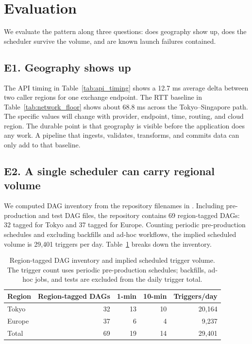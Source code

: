 \documentclass[11pt, reqno]{amsart}
\newcommand{\code}[1]{\texttt{\detokenize{#1}}}
\begin{document}
\section{Evaluation}
\label{sec:evaluation}

We evaluate the pattern along three questions: does geography show up, does the scheduler survive the volume, and are known launch failures contained.

\subsection{E1. Geography shows up}

The API timing in Table~\ref{tab:api_timing} shows a 12.7 ms average delta between two caller regions for one exchange endpoint. The RTT baseline in Table~\ref{tab:network_floor} shows about 68.8 ms across the Tokyo--Singapore path. The specific values will change with provider, endpoint, time, routing, and cloud region. The durable point is that geography is visible before the application does any work. A pipeline that ingests, validates, transforms, and commits data can only add to that baseline.

\subsection{E2. A single scheduler can carry regional volume}

We computed DAG inventory from the repository filenames in \code{datapull/airflow/dags/datapull}. Including pre-production and test DAG files, the repository contains 69 region-tagged DAGs: 32 tagged for Tokyo and 37 tagged for Europe. Counting periodic pre-production schedules and excluding backfills and ad-hoc workflows, the implied scheduled volume is 29,401 triggers per day. Table~\ref{tab:dag_volume} breaks down the inventory.

\begin{table}[H]
\centering
\begin{tabular}{lrrrr}
\toprule
\textbf{Region} & \textbf{Region-tagged DAGs} & \textbf{1-min} & \textbf{10-min} & \textbf{Triggers/day} \\
\midrule
Tokyo & 32 & 13 & 10 & 20,164 \\
Europe & 37 & 6 & 4 & 9,237 \\
\midrule
Total & 69 & 19 & 14 & 29,401 \\
\bottomrule
\end{tabular}
\caption{Region-tagged DAG inventory and implied scheduled trigger volume. The trigger count uses periodic pre-production schedules; backfills, ad-hoc jobs, and tests are excluded from the daily trigger total.}
\label{tab:dag_volume}
\end{table}
\end{document}
